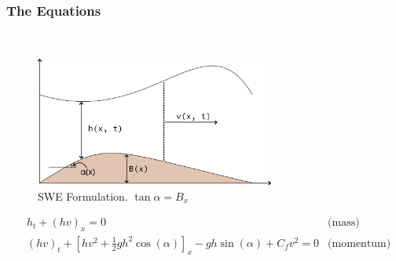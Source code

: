 \begin{frame}
    \frametitle{The Equations}

    \ \\
    \setlength{\belowcaptionskip}{-20pt}
    \begin{figure}
        \centering
        \includegraphics[width=0.7\textwidth]{images/swe_diagram.png}
        \caption{SWE Formulation. $\tan{\alpha} = B_x$}
        \label{fig:03_swe_diagram}
    \end{figure}

    \begin{align*}
           & h_t + (h v)_x = 0 & \text{(mass)} \\
           & (h v)_t + \left[ hv^2 + \frac{1}{2} g h^2 \cos{(\alpha)} \right]_x - g h \sin{(\alpha)} + C_f v^2 = 0 & \text{(momentum)}
    \end{align*}
\end{frame}